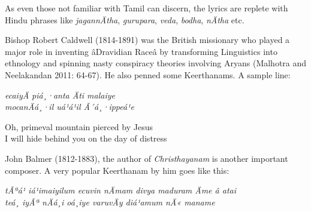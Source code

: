 As even those not familiar with Tamil can discern, the lyrics are replete with Hindu phrases like \textit{jagannÄtha}, \textit{gurupara}, \textit{veda}, \textit{bodha}, \textit{nÄtha} etc.

Bishop Robert Caldwell (1814-1891) was the British missionary who played a major role in inventing âDravidian Raceâ by transforming Linguistics into ethnology and spinning nasty conspiracy theories involving Aryans (Malhotra and Neelakandan 2011: 64-67). He also penned some Keerthanams. A sample line:

\begin{myquote}
\hspace{2cm}\textit{ecaiyÄ piá¸·anta Äti malaiye\\\hspace{2cm} mocanÄá¸·il uá¹á¹il Ã´á¸·ippeá¹e }
\end{myquote}

\begin{myquote}
\hspace{2cm}
\end{myquote}

\begin{myquote}
\hspace{2cm}Oh, primeval mountain pierced by Jesus\\\hspace{2cm} I will hide behind you on the day of distress
\end{myquote}

John Balmer (1812-1883), the author of \textit{Christhayanam} is another important composer. A very popular Keerthanam by him goes like this:

\begin{myquote}
\textit{tÃªá¹ iá¹imaiyilum ecuvin nÄmam divya maduram Äme â atai\\ teá¸ iyÃª nÄá¸i oá¸iye varuvÄy diá¹amum nÄ« maname}
\end{myquote}

\begin{myquote}
\end{myquote}

